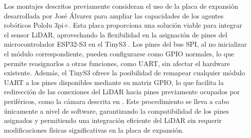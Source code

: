 Los montajes descritos previamente consideran el uso de la placa de expansión desarrollada por José Álvarez para ampliar las capacidades de los agentes robóticos Pololu 3pi+. Esta placa proporciona una solución viable para integrar el sensor LiDAR, aprovechando la flexibilidad en la asignación de pines del microcontrolador ESP32-S3 en el TinyS3 \cite{jose_alvarez_2023}. Los pines del bus SPI, al no inicializar el módulo correspondiente, pueden configurarse como GPIO normales, lo que permite reasignarlos a otras funciones, como UART, sin afectar el hardware existente.  Además, el TinyS3 ofrece la posibilidad de remapear cualquier módulo UART a los pines disponibles mediante su matriz GPIO, lo que facilita la redirección de las conexiones del LiDAR hacia pines previamente ocupados por periféricos, como la cámara descrita en \cite{jose_alvarez_2023}. Este procedimiento se lleva a cabo únicamente a nivel de software, garantizando la compatibilidad de los pines asignados y permitiendo una integración eficiente del LiDAR sin requerir modificaciones físicas significativas en la placa de expansión.
